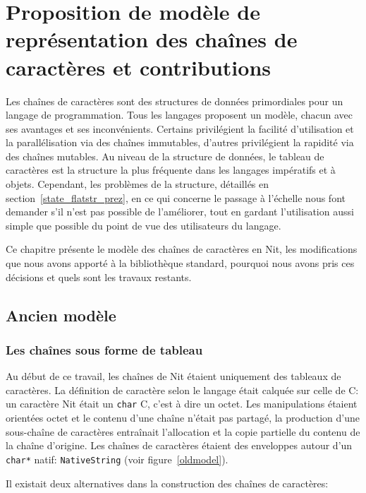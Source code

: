 \chapter{Proposition de modèle de représentation des chaînes de caractères et contributions}\label{solution_chap}

Les chaînes de caractères sont des structures de données primordiales pour un langage de programmation.
Tous les langages proposent un modèle, chacun avec ses avantages et ses inconvénients.
Certains privilégient la facilité d'utilisation et la parallélisation via des chaînes immutables,
d'autres privilégient la rapidité via des chaînes mutables.
Au niveau de la structure de données, le tableau de caractères est la structure la plus fréquente
dans les langages impératifs et à objets.
Cependant, les problèmes de la structure, détaillés en section~\ref{state_flatstr_prez}, en
ce qui concerne le passage à l'échelle nous font demander s'il n'est
pas possible de l'améliorer, tout en gardant l'utilisation aussi simple que possible du point
de vue des utilisateurs du langage.

Ce chapitre présente le modèle des chaînes de caractères en Nit, 
les modifications que nous avons apporté à la bibliothèque standard, pourquoi nous avons pris
ces décisions et quels sont les travaux restants.

\section{Ancien modèle}

\subsection{Les chaînes sous forme de tableau}

Au début de ce travail, les chaînes de Nit étaient uniquement des tableaux de caractères.
La définition de caractère selon le langage était calquée sur celle de C: un caractère Nit
était un \texttt{char} C, c'est à dire un octet.
Les manipulations étaient orientées octet et le contenu d'une chaîne n'était pas partagé,
la production d'une sous-chaîne de caractères entraînait l'allocation et la copie partielle du
contenu de la chaîne d'origine.
Les chaînes de caractères étaient des enveloppes autour d'un \texttt{char*} natif: \texttt{NativeString}
(voir figure~\ref{oldmodel}).

Il existait deux alternatives dans la construction des chaînes de caractères:

